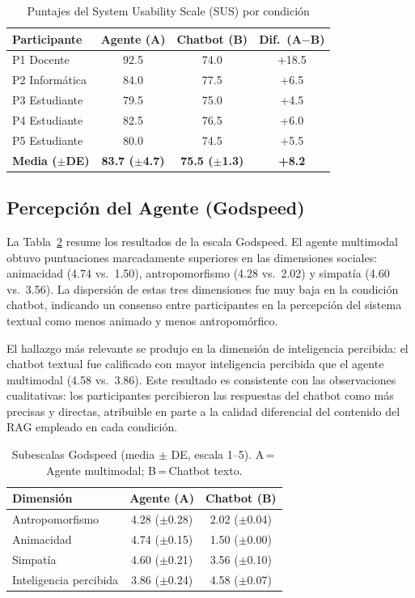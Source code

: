 \documentclass[conference]{IEEEtran}
\begin{document}
\begin{table}[htbp]
\caption{Puntajes del System Usability Scale (SUS) por condición}
\label{tab:sus}
\centering
\begin{tabular}{lccc}
\toprule
Participante & Agente (A) & Chatbot (B) & Dif.\ (A$-$B) \\
\midrule
P1 Docente          & 92.5 & 74.0 & +18.5 \\
P2 Inform\'atica    & 84.0 & 77.5 & +6.5  \\
P3 Estudiante       & 79.5 & 75.0 & +4.5  \\
P4 Estudiante       & 82.5 & 76.5 & +6.0  \\
P5 Estudiante       & 80.0 & 74.5 & +5.5  \\
\midrule
\textbf{Media ($\pm$DE)} & \textbf{83.7 ($\pm$4.7)} & \textbf{75.5 ($\pm$1.3)} & \textbf{+8.2} \\
\bottomrule
\end{tabular}
\end{table}

\subsection{Percepción del Agente (Godspeed)}
La Tabla~\ref{tab:godspeed} resume los resultados de la escala Godspeed. El agente multimodal obtuvo puntuaciones marcadamente superiores en las dimensiones sociales: animacidad (4.74 vs.~1.50), antropomorfismo (4.28 vs.~2.02) y simpatía (4.60 vs.~3.56). La dispersión de estas tres dimensiones fue muy baja en la condición chatbot, indicando un consenso entre participantes en la percepción del sistema textual como menos animado y menos antropomórfico.

El hallazgo más relevante se produjo en la dimensión de inteligencia percibida: el chatbot textual fue calificado con mayor inteligencia percibida que el agente multimodal (4.58 vs.~3.86). Este resultado es consistente con las observaciones cualitativas: los participantes percibieron las respuestas del chatbot como más precisas y directas, atribuible en parte a la calidad diferencial del contenido del RAG empleado en cada condición.
\begin{table}[htbp]
\caption{Subescalas Godspeed (media $\pm$ DE, escala 1--5). A\,=\,Agente multimodal; B\,=\,Chatbot texto.}
\label{tab:godspeed}
\centering
\begin{tabular}{lcc}
\toprule
Dimensi\'on & Agente (A) & Chatbot (B) \\
\midrule
Antropomorfismo        & 4.28 ($\pm$0.28) & 2.02 ($\pm$0.04) \\
Animacidad             & 4.74 ($\pm$0.15) & 1.50 ($\pm$0.00) \\
Simpat\'ia             & 4.60 ($\pm$0.21) & 3.56 ($\pm$0.10) \\
Inteligencia percibida & 3.86 ($\pm$0.24) & 4.58 ($\pm$0.07) \\
\bottomrule
\end{tabular}
\end{table}
\end{document}
